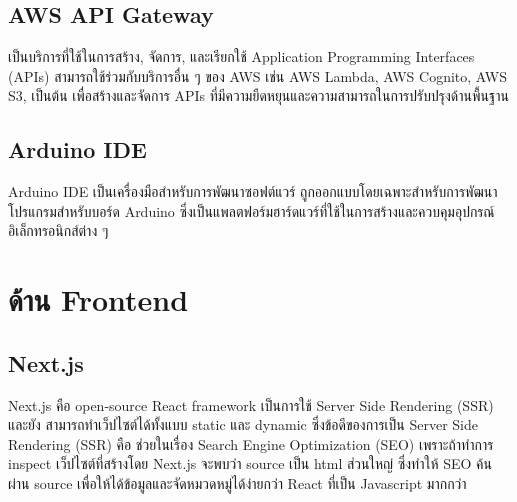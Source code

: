\subsection{AWS API Gateway}
เป็นบริการที่ใช้ในการสร้าง, จัดการ, และเรียกใช้ Application Programming Interfaces (APIs) สามารถใช้ร่วมกับบริการอื่น ๆ ของ AWS เช่น AWS Lambda, AWS Cognito, AWS S3, เป็นต้น เพื่อสร้างและจัดการ APIs ที่มีความยืดหยุนและความสามารถในการปรับปรุงด้านพื้นฐาน

\subsection{Arduino IDE}
Arduino IDE เป็นเครื่องมือสำหรับการพัฒนาซอฟต์แวร์ ถูกออกแบบโดยเฉพาะสำหรับการพัฒนาโปรแกรมสำหรับบอร์ด Arduino ซึ่งเป็นแพลตฟอร์มฮาร์ดแวร์ที่ใช้ในการสร้างและควบคุมอุปกรณ์อิเล็กทรอนิกส์ต่าง ๆ



\section{ด้าน Frontend}

\subsection{Next.js}
Next.js คือ open-source React framework เป็นการใช้ Server Side Rendering (SSR) และยัง
\enskip \enskip \enspace
สามารถทำเว็ปไซต์ได้ทั้งแบบ static และ dynamic
ซึ่งข้อดีของการเป็น Server Side Rendering (SSR) คือ ช่วยในเรื่อง Search Engine Optimization (SEO) เพราะถ้าทำการ inspect เว็ปไซต์ที่สร้างโดย Next.js จะพบว่า source เป็น html ส่วนใหญ่ ซึ่งทำให้ SEO ค้นผ่าน source เพื่อให้ได้ข้อมูลและจัดหมวดหมู่ได้ง่ายกว่า React ที่เป็น Javascript มากกว่า

